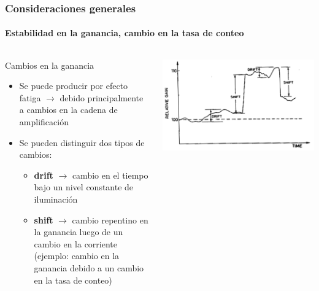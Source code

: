 \documentclass{beamer}
\begin{document}
\begin{frame}
\frametitle{Consideraciones generales}
\framesubtitle{Estabilidad en la ganancia, cambio en la tasa de conteo}
\begin{columns}
\begin{column}{0.60\textwidth}
\alert{Cambios en la ganancia}
\begin{itemize}
\item Se puede producir por efecto \alert{fatiga} $\rightarrow$ debido
principalmente a cambios en la cadena de amplificación
\item Se pueden distinguir dos tipos de cambios:
\begin{itemize}
\item \textbf{drift} $\rightarrow$ cambio en el tiempo bajo un nivel constante
de iluminación  
\item \textbf{shift} $\rightarrow$ cambio repentino en la ganancia luego de un
cambio en la corriente (ejemplo: cambio en la ganancia debido a un cambio en la
tasa de conteo)
\end{itemize}
\end{itemize}
\end{column} 
\begin{column}{0.40\textwidth}
\begin{center}
\includegraphics[width=\textwidth]{d1/shift_and_drift_pmt}
\end{center}
\end{column}
\end{columns}
\end{frame} 
\end{document}
